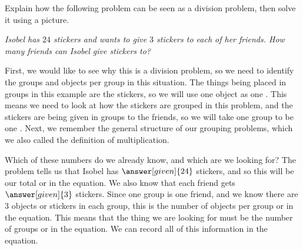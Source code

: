 \documentclass{ximera}
\begin{document}
\begin{example}
Explain how the following problem can be seen as a division problem, then solve it using a picture. 

\emph{Isobel has $24$ stickers and wants to give $3$ stickers to each of her friends. How many friends can Isobel give stickers to?}

First, we would like to see why this is a division problem, so we need to identify the groups and objects per group in this situation. The things being placed in groups in this example are the stickers, so we will use one object as one . This means we need to look at how the stickers are grouped in this problem, and the stickers are being given in groups to the friends, so we will take one group to be one . Next, we remember the general structure of our grouping problems, which we also called the definition of multiplication.
\begin{image}
\end{image}

Which of these numbers do we already know, and which are we looking for? The problem tells us that Isobel has $\answer[given]{24}$ stickers, and so this will be our total or  in the equation. We also know that each friend gets $\answer[given]{3}$ stickers. Since one group is one friend, and we know there are $3$ objects or stickers in each group, this is the number of objects per group or   in the equation. This means that the thing we are looking for must be the number of groups or  in the equation. We can record all of this information in the equation.
\begin{image}
\end{image}


\end{example}
\end{document}

